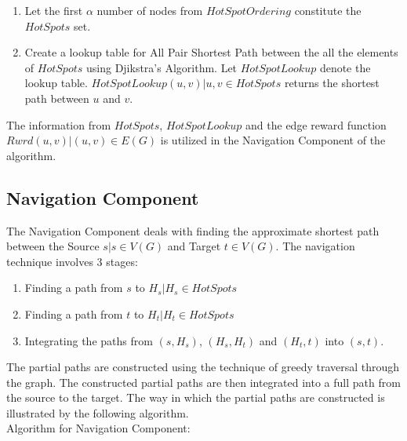 \documentclass{article}
\begin{document}
\begin{enumerate}
\item Let the first $\alpha$ number of nodes from $HotSpotOrdering$ constitute the $HotSpots$ set. 

\item Create a lookup table for All Pair Shortest Path between the all the elements of $HotSpots$ using Djikstra's Algorithm. Let $HotSpotLookup$ denote the lookup table. $HotSpotLookup(u,v) | u,v \in HotSpots$ returns the shortest path between $u$ and $v$.

\end{enumerate}

The information from $HotSpots$, $HotSpotLookup$ and the edge reward function $Rwrd(u,v) | (u,v) \in E(G)$ is utilized in the Navigation Component of the algorithm.

\subsection{Navigation Component}
The Navigation Component deals with finding the approximate shortest path between the Source $s | s \in V(G)$ and Target $t \in V(G)$. The navigation technique involves 3 stages:
\begin{enumerate}
\item Finding a path from $s$ to $H_s | H_s \in HotSpots$
\item Finding a path from $t$ to $H_t | H_t \in HotSpots$
\item Integrating the paths from $(s,H_s)$, $(H_s, H_t)$ and $(H_t,t)$ into $(s,t)$.\\
\end{enumerate}

The partial paths are constructed using the technique of greedy traversal through the graph. The constructed partial paths are then integrated into a full path from the source to the target. The way in which the partial paths are constructed is illustrated by the following algorithm.\\

Algorithm for Navigation Component:
\end{document}
